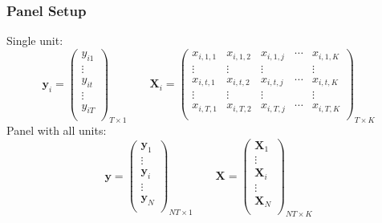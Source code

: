 \documentclass[xcolor=svgnames,9pt,english, aspectratio=169]{beamer}
\newcommand{\mb}{\mathbf}
\newcommand{\X}{\ensuremath{\mb{X}}}
\newcommand{\y}{\ensuremath{\mb{y}}}
\begin{document}
\begin{frame}
\small
  \frametitle{Panel Setup}
Single unit: $$
\y_i = \left(
  \begin{array}{c}
    y_{i1} \\
     \vdots\\
    y_{it} \\
    \vdots \\
    y_{iT} \\
  \end{array}
\right)_{T \times 1} \qquad  \X_i = \left(
  \begin{array}{cccccc}
    x_{i,1,1} & x_{i,1,2} & x_{i,1,j} & \dotsb &  x_{i,1,K} \\
     \vdots & \vdots & \vdots & & \vdots\\
   x_{i,t,1} & x_{i,t,2} & x_{i,t,j} & \dotsb &  x_{i,t,K} \\
   \vdots & \vdots & \vdots & & \vdots\\
   x_{i,T,1} & x_{i,T,2} & x_{i,T,j} & \dotsb &  x_{i,T,K} \\
  \end{array}
\right)_{T \times K}
$$
Panel with all units: $$
\y = \left(
  \begin{array}{c}
    \y_{1} \\
     \vdots\\
    \y_{i} \\
    \vdots \\
    \y_{N} \\
  \end{array}
\right)_{NT \times 1} \qquad  \X = \left(
  \begin{array}{c}
    \X_{1} \\
     \vdots\\
    \X_{i} \\
    \vdots \\
   \X_{N} \\
  \end{array}
\right)_{NT \times K}
$$
\end{frame}
\end{document}
